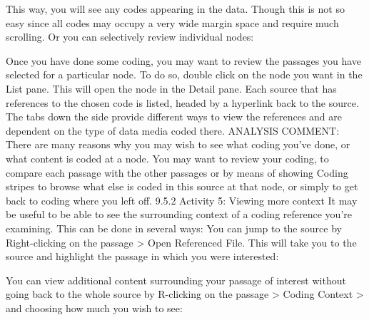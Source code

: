 \documentclass[
]{book}
\begin{document}
This way, you will see any codes appearing in the data. Though this is not so easy since all codes may occupy a very wide margin space and require much scrolling. Or you can selectively review individual nodes:

Once you have done some coding, you may want to review the passages you have selected for a particular node. To do so, double click on the node you want in the List pane. This will open the node in the Detail pane. Each source that has references to the chosen code is listed, headed by a hyperlink back to the source.
The tabs down the side provide different ways to view the references and are dependent on the type of data media coded there.
ANALYSIS COMMENT: There are many reasons why you may wish to see what coding you've done, or what content is coded at a node. You may want to review your coding, to compare each passage with the other passages or by means of showing Coding stripes to browse what else is coded in this source at that node, or simply to get back to coding where you left off.
9.5.2 Activity 5: Viewing more context
It may be useful to be able to see the surrounding context of a coding reference you're examining. This can be done in several ways:
You can jump to the source by Right-clicking on the passage \textgreater{} Open Referenced File. This will take you to the source and highlight the passage in which you were interested:

You can view additional content surrounding your passage of interest without going back to the whole source by R-clicking on the passage \textgreater{} Coding Context \textgreater{} and choosing how much you wish to see:
\end{document}
